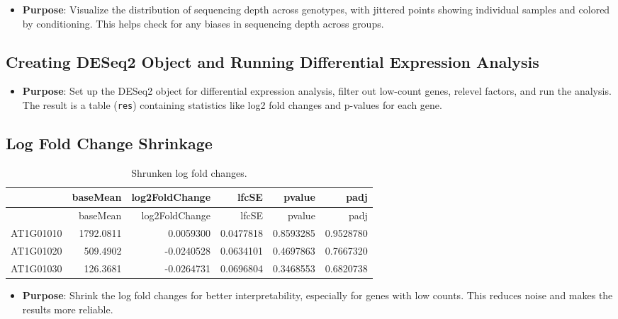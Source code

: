 \documentclass[
  11pt,
]{article}
\providecommand{\tightlist}{%
  \setlength{\itemsep}{0pt}\setlength{\parskip}{0pt}}\usepackage{longtable,booktabs,array}
\begin{document}
\begin{itemize}
\tightlist
\item
  \textbf{Purpose}: Visualize the distribution of sequencing depth
  across genotypes, with jittered points showing individual samples and
  colored by conditioning. This helps check for any biases in sequencing
  depth across groups.
\end{itemize}

\subsection{Creating DESeq2 Object and Running Differential Expression
Analysis}\label{creating-deseq2-object-and-running-differential-expression-analysis}

\begin{itemize}
\tightlist
\item
  \textbf{Purpose}: Set up the DESeq2 object for differential expression
  analysis, filter out low-count genes, relevel factors, and run the
  analysis. The result is a table (\texttt{res}) containing statistics
  like log2 fold changes and p-values for each gene.
\end{itemize}

\subsection{Log Fold Change Shrinkage}\label{log-fold-change-shrinkage}

\begin{longtable}[]{@{}lrrrrr@{}}
\caption{Shrunken log fold changes.}\tabularnewline
\toprule\noalign{}
& baseMean & log2FoldChange & lfcSE & pvalue & padj \\
\midrule\noalign{}
\endfirsthead
\toprule\noalign{}
& baseMean & log2FoldChange & lfcSE & pvalue & padj \\
\midrule\noalign{}
\endhead
\bottomrule\noalign{}
\endlastfoot
AT1G01010 & 1792.0811 & 0.0059300 & 0.0477818 & 0.8593285 & 0.9528780 \\
AT1G01020 & 509.4902 & -0.0240528 & 0.0634101 & 0.4697863 & 0.7667320 \\
AT1G01030 & 126.3681 & -0.0264731 & 0.0696804 & 0.3468553 & 0.6820738 \\
\end{longtable}

\begin{itemize}
\tightlist
\item
  \textbf{Purpose}: Shrink the log fold changes for better
  interpretability, especially for genes with low counts. This reduces
  noise and makes the results more reliable.
\end{itemize}
\end{document}
